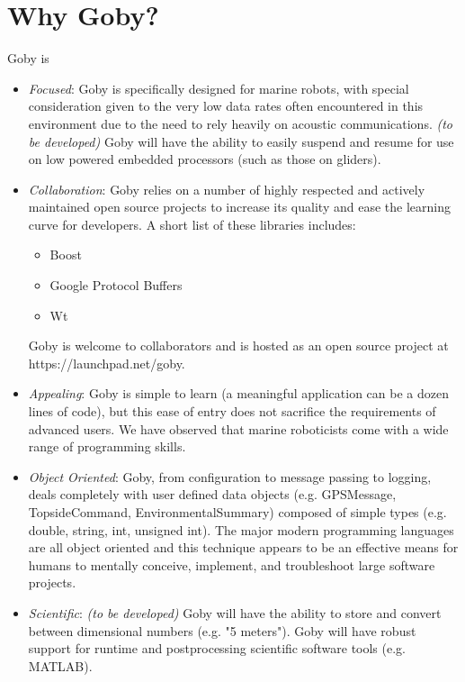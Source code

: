 \documentclass[11pt, letterpaper]{article}
\begin{document}
\section{Why Goby?}

Goby is

\begin{itemize}
\item \textit{Focused}: Goby is specifically designed for marine robots, with special consideration given to the very low data rates often encountered in this environment due to the need to rely heavily on acoustic communications. \textit{(to be developed)} Goby will have the ability to easily suspend and resume for use on low powered embedded processors (such as those on gliders).
\item \textit{Collaboration}: Goby relies on a number of highly respected and actively maintained open source projects to increase its quality and ease the learning curve for developers. A short list of these libraries includes:
\begin{itemize}
\item Boost
\item Google Protocol Buffers
\item Wt
\end{itemize}
Goby is welcome to collaborators and is hosted as an open source project at \\ https://launchpad.net/goby.
\item \textit{Appealing}: Goby is simple to learn (a meaningful application can be a dozen lines of code), but this ease of entry does not sacrifice the requirements of advanced users. We have observed that marine roboticists come with a wide range of programming skills.
\item \textit{Object Oriented}: Goby, from configuration to message passing to logging, deals completely with user defined data objects (e.g. GPSMessage, TopsideCommand, EnvironmentalSummary) composed of simple types (e.g. double, string, int, unsigned int). The major modern programming languages are all object oriented and this technique appears to be  an effective means for humans to mentally conceive, implement, and troubleshoot large software projects.
\item \textit{Scientific}: \textit{(to be developed)} Goby will have the ability to store and convert between dimensional numbers (e.g. "5 meters"). Goby will have robust support for runtime and postprocessing scientific software tools (e.g. MATLAB).
\end{itemize}
\end{document}
